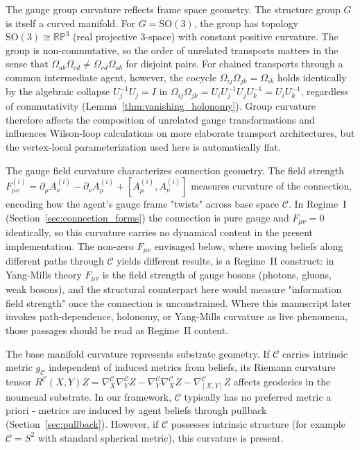 \documentclass[11pt]{article}
\begin{document}
The gauge group curvature reflects frame space geometry. The structure group $G$ is itself a curved manifold. For $G = \mathrm{SO}(3)$, the group has topology $\mathrm{SO}(3) \cong \mathbb{RP}^3$ (real projective 3-space) with constant positive curvature. The group is non-commutative, so the order of unrelated transports matters in the sense that $\Omega_{ab}\Omega_{cd} \neq \Omega_{cd}\Omega_{ab}$ for disjoint pairs. For chained transports through a common intermediate agent, however, the cocycle $\Omega_{ij}\Omega_{jk} = \Omega_{ik}$ holds identically by the algebraic collapse $U_j^{-1}U_j = I$ in $\Omega_{ij}\Omega_{jk} = U_iU_j^{-1}U_jU_k^{-1} = U_iU_k^{-1}$, regardless of commutativity (Lemma~\ref{thm:vanishing_holonomy}). Group curvature therefore affects the composition of unrelated gauge transformations and influences Wilson-loop calculations on more elaborate transport architectures, but the vertex-local parameterization used here is automatically flat.

The gauge field curvature characterizes connection geometry. The field strength $F^{(i)}_{\mu\nu} = \partial_\mu A^{(i)}_\nu - \partial_\nu A^{(i)}_\mu + [A^{(i)}_\mu, A^{(i)}_\nu]$ measures curvature of the connection, encoding how the agent's gauge frame "twists" across base space $\mathcal{C}$. In Regime~I (Section~\ref{sec:connection_forms}) the connection is pure gauge and $F_{\mu\nu} = 0$ identically, so this curvature carries no dynamical content in the present implementation. The non-zero $F_{\mu\nu}$ envisaged below, where moving beliefs along different paths through $\mathcal{C}$ yields different results, is a Regime~II construct: in Yang-Mills theory $F_{\mu\nu}$ is the field strength of gauge bosons (photons, gluons, weak bosons), and the structural counterpart here would measure "information field strength" once the connection is unconstrained. Where this manuscript later invokes path-dependence, holonomy, or Yang-Mills curvature as live phenomena, those passages should be read as Regime~II content.

The base manifold curvature represents substrate geometry. If $\mathcal{C}$ carries intrinsic metric $g_{\mathcal{C}}$ independent of induced metrics from beliefs, its Riemann curvature tensor $R^\mathcal{C}(X,Y)Z = \nabla^\mathcal{C}_X \nabla^\mathcal{C}_Y Z - \nabla^\mathcal{C}_Y \nabla^\mathcal{C}_X Z - \nabla^\mathcal{C}_{[X,Y]} Z$ affects geodesics in the noumenal substrate. In our framework, $\mathcal{C}$ typically has no preferred metric a priori - metrics are induced by agent beliefs through pullback (Section~\ref{sec:pullback}). However, if $\mathcal{C}$ possesses intrinsic structure (for example $\mathcal{C} = S^2$ with standard spherical metric), this curvature is present.
\end{document}
